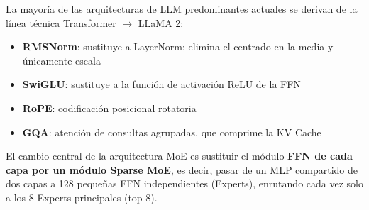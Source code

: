 La mayoría de las arquitecturas de LLM predominantes actuales se derivan de la línea técnica Transformer $\to$ LLaMA 2:

\begin{itemize}
  \item \textbf{RMSNorm}: sustituye a LayerNorm; elimina el centrado en la media y únicamente escala
  \item \textbf{SwiGLU}: sustituye a la función de activación ReLU de la FFN
  \item \textbf{RoPE}: codificación posicional rotatoria
  \item \textbf{GQA}: atención de consultas agrupadas, que comprime la KV Cache
\end{itemize}

El cambio central de la arquitectura MoE es sustituir el módulo \textbf{FFN de cada capa por un módulo Sparse MoE}, es decir, pasar de un MLP compartido de dos capas a 128 pequeñas FFN independientes (Experts), enrutando cada vez solo a los 8 Experts principales (top-8).
